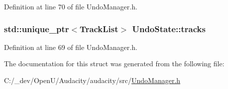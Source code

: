 Definition at line 70 of file Undo\+Manager.\+h.

\subsubsection[{\texorpdfstring{tracks}{tracks}}]{\setlength{\rightskip}{0pt plus 5cm}std\+::unique\+\_\+ptr$<${\bf Track\+List}$>$ Undo\+State\+::tracks}\hypertarget{struct_undo_state_a72dceb89d0c5fe495d97f5aad787cb7c}{}\label{struct_undo_state_a72dceb89d0c5fe495d97f5aad787cb7c}


Definition at line 69 of file Undo\+Manager.\+h.



The documentation for this struct was generated from the following file\+:\begin{DoxyCompactItemize}
\item 
C\+:/\+\_\+dev/\+Open\+U/\+Audacity/audacity/src/\hyperlink{_undo_manager_8h}{Undo\+Manager.\+h}\end{DoxyCompactItemize}
